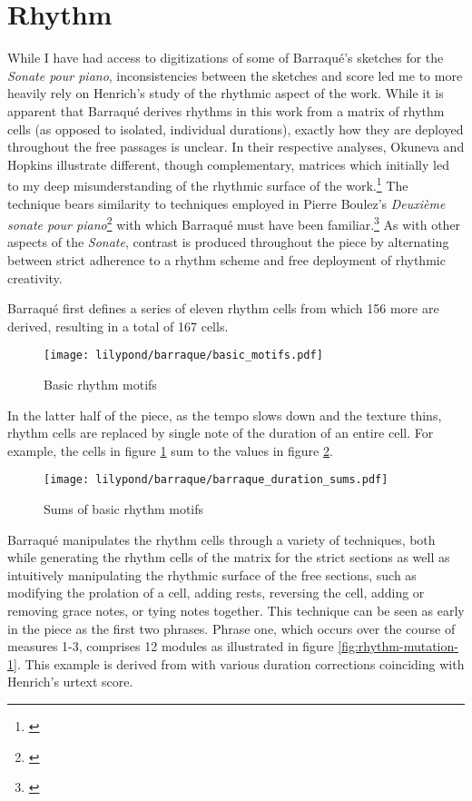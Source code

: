 \section{Rhythm}

While I have had access to digitizations of some of Barraqué's sketches for the \textit{Sonate pour piano}, inconsistencies between the sketches and score led me to more heavily rely on Henrich's study of the rhythmic aspect of the work. While it is apparent that Barraqué derives rhythms in this work from a matrix of rhythm cells (as opposed to isolated, individual durations), exactly how they are deployed throughout the free passages is unclear. In their respective analyses, Okuneva and Hopkins illustrate different, though complementary, matrices which initially led to my deep misunderstanding of the rhythmic surface of the work.\footnote{\citet[20]{hopkins}} The technique bears similarity to techniques employed in Pierre Boulez's \textit{Deuxième sonate pour piano}\footnote{\citet[110]{boulez-piano}} with which Barraqué must have been familiar.\footnote{\citet[38]{barraque-griffiths}} As with other aspects of the \textit{Sonate}, contrast is produced throughout the piece by alternating between strict adherence to a rhythm scheme and free deployment of rhythmic creativity.

Barraqué first defines a series of eleven rhythm cells from which 156 more are derived, resulting in a total of 167 cells.

\begin{figure}[H]
    \texttt{[image: lilypond/barraque/basic\_motifs.pdf]}
    \caption{Basic rhythm motifs}
    \label{fig:rhythm-modules}
\end{figure}

In the latter half of the piece, as the tempo slows down and the texture thins, rhythm cells are replaced by single note of the duration of an entire cell. For example, the cells in figure \ref{fig:rhythm-modules} sum to the values in figure \ref{fig:rhythm-sums}.

\begin{figure}[H]
    \texttt{[image: lilypond/barraque/barraque\_duration\_sums.pdf]}
    \caption{Sums of basic rhythm motifs}
    \label{fig:rhythm-sums}
\end{figure}

Barraqué manipulates the rhythm cells through a variety of techniques, both while generating the rhythm cells of the matrix for the strict sections as well as intuitively manipulating the rhythmic surface of the free sections, such as modifying the prolation of a cell, adding rests, reversing the cell, adding or removing grace notes, or tying notes together. This technique can be seen as early in the piece as the first two phrases. Phrase one, which occurs over the course of measures 1-3, comprises 12 modules as illustrated in figure \ref{fig:rhythm-mutation-1}. This example is derived from \citet[96]{barraque-konzepte} with various duration corrections coinciding with Henrich's urtext score.

